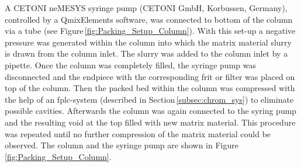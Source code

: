A CETONI neMESYS syringe pump (CETONI GmbH, Korbussen, Germany), controlled by a QmixElements software, was connected to bottom of the column via a tube (see Figure\,\ref{fig:Packing_Setup_Column}). With this set-up a negative pressure was generated within the column into which the matrix material slurry is drawn from the column inlet. The slurry was added to the column inlet by a pipette. Once the column was completely filled, the syringe pump was disconnected and the endpiece with the corresponding frit or filter was placed on top of the column. Then the packed bed within the column was compressed with the help of an \gls{fplc}-system (described in Section\,\ref{subsec:chrom_sys}) to eliminate possible cavities. Afterwards the column was again connected to the syring pump and the resulting void at the top filled with new matrix material. This procedure was repeated until no further compression of the matrix material could be observed. The column and the syringe pump are shown in Figure\,\ref{fig:Packing_Setup_Column}.

